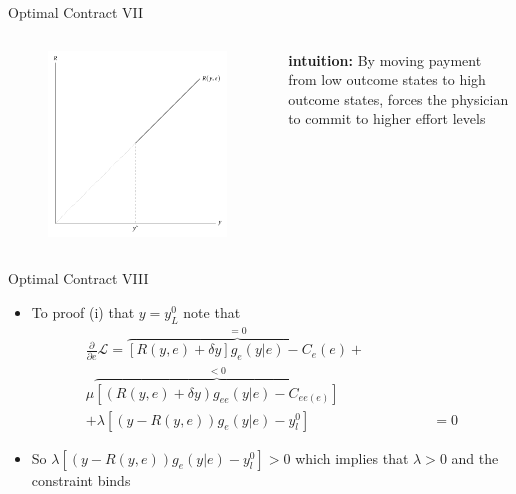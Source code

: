 \documentclass[compress]{beamer}
\begin{document}
\begin{frame}[c]{Optimal Contract VII}
  \begin{columns}
    \centering
    \begin{figure}[htbp]
      \centering
      \includegraphics[width=1\textwidth]{../../fig/optimal-R.pdf}
    \end{figure}
        
    \textbf{intuition:} By moving payment from low outcome states to high outcome states, forces the physician to commit to higher effort levels
  \end{columns}
\end{frame}

\begin{frame}[c]{Optimal Contract VIII}
  \begin{itemize}
    \item To proof (i) that $y=y_L^0$ note that 
          \begin{align}
            \frac{\partial}{\partial e} \mathcal{L}=\overbrace{[R(y,e)+\delta y]g_e(y|e)-C_e(e)}^{=0}+ \qquad \qquad \nonumber \\ 
            \mu\overbrace{\left[(R(y,e)+\delta y)g_{ee}(y|e)- C_{ee(e)}\right]}^{<0} \qquad & \nonumber \\ 
            +\lambda\left[(y-R(y,e)) g_e(y|e)-y_l^0\right]                                  & =0        
          \end{align}
    \item So $\lambda\left[(y-R(y,e)) g_e(y|e)-y_l^0\right]>0$ which implies that $\lambda>0$ and the constraint binds
  \end{itemize}
\end{frame}
\end{document}
